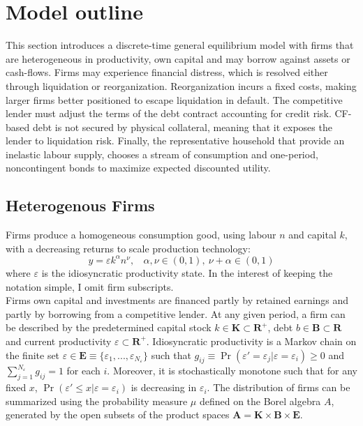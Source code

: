 \documentclass[12pt]{article}
\begin{document}
\section{Model outline} \label{sec:model}
This section introduces a discrete-time general equilibrium model with firms that are heterogeneous in productivity, own capital and may borrow against assets or cash-flows. Firms may experience financial distress, which is resolved either through liquidation or reorganization. Reorganization incurs a fixed costs, making larger firms better positioned to escape liquidation in default. The competitive lender must adjust the terms of the debt contract accounting for credit risk. CF-based debt is not secured by physical collateral, meaning that it exposes the lender to liquidation risk. Finally, the representative household that provide an inelastic labour supply, chooses a stream of consumption and one-period, noncontingent bonds to maximize expected discounted utility. 
\subsection{Heterogenous Firms \label{sec:firms}}
Firms produce a homogeneous consumption good, using labour $n$ and capital $k$, with a decreasing returns to scale production technology:
\begin{equation} \label{eq:prodf}
y = \varepsilon k^{\alpha}n^{\nu}, \ \ \ \ \alpha,\nu \in (0,1),  \ \nu + \alpha \in (0,1)
\end{equation}  
where $\varepsilon$ is the idiosyncratic productivity state. In the interest of keeping the notation simple, I omit firm subscripts. \vspace{3mm} \\
Firms own capital and investments are financed partly by retained earnings and partly by borrowing from a competitive lender. At any given period, a firm can be described by the predetermined capital stock $k \in \mathbf{K} \subset \mathbf{R^{+}}$, debt $b \in \mathbf{B} \subset \mathbf{R}$ and current productivity $\varepsilon \subset \mathbf{R^+}$.  Idiosyncratic productivity is a Markov chain on the finite set $\varepsilon \in \mathbf{E} \equiv \{ \varepsilon_1,...,\varepsilon_{N_{\varepsilon}} \}$ such that $ g_{ij} \equiv \Pr(\varepsilon'= \varepsilon_j|\varepsilon = \varepsilon_i) \geq 0$ and $\sum_{j=1}^{N_{\varepsilon}} g_{ij} = 1$ for each $i$. Moreover, it is stochastically monotone such that for any fixed $x$, $\Pr(\varepsilon' \leq x | \varepsilon = \varepsilon_i)$ is decreasing in $\varepsilon_i$. The distribution of firms can be summarized using the probability measure $\mu$ defined on the Borel algebra $A$, generated by the open subsets of the product spaces $ \mathbf{A} = \mathbf{K} \times \mathbf{B} \times \mathbf{E} $.
\end{document}
